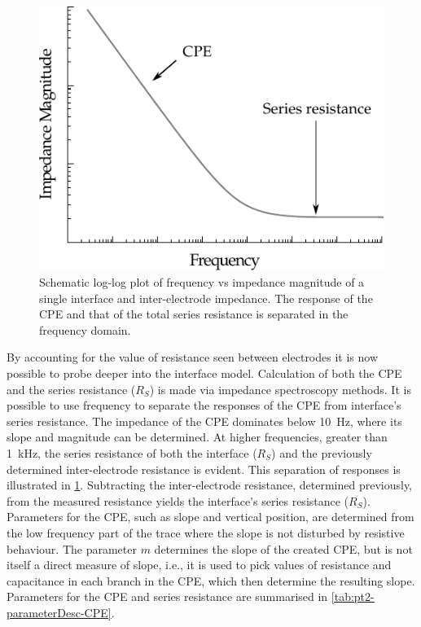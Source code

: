     \begin{figure}[h]
      \centering
      \includegraphics{content/pt2/07-InterfaceModel/graphics/graph_cpePlotGeneral}
      \caption{\label{fig:pt2-graph_cpePlotGeneral}Schematic log-log plot of frequency vs impedance magnitude of a single interface and inter-electrode impedance. The response of the CPE and that of the total series resistance is separated in the frequency domain.}
    \end{figure}
    By accounting for the value of resistance seen between electrodes it is now possible to probe deeper into the interface model.
    Calculation of both the CPE and the series resistance ($R_S$) is made via impedance spectroscopy methods.
    It is possible to use frequency to separate the responses of the CPE from interface's series resistance.
    The impedance of the CPE dominates below \SI{10}{\hertz}, where its slope and magnitude can be determined.
    At higher frequencies, greater than \SI{1}{\kilo\hertz}, the series resistance of both the interface ($R_S$) and the previously determined inter-electrode resistance is evident.
    This separation of responses is illustrated in \cref{fig:pt2-graph_cpePlotGeneral}.
    Subtracting the inter-electrode resistance, determined previously, from the measured resistance yields the interface's series resistance ($R_S$).
    Parameters for the CPE, such as slope and vertical position, are determined from the low frequency part of the trace where the slope is not disturbed by resistive behaviour.
    The parameter $m$ determines the slope of the created CPE, but is not itself a direct measure of slope, i.e., it is used to pick values of resistance and capacitance in each branch in the CPE, which then determine the resulting slope.
    Parameters for the CPE and series resistance are summarised in \cref{tab:pt2-parameterDesc-CPE}.

